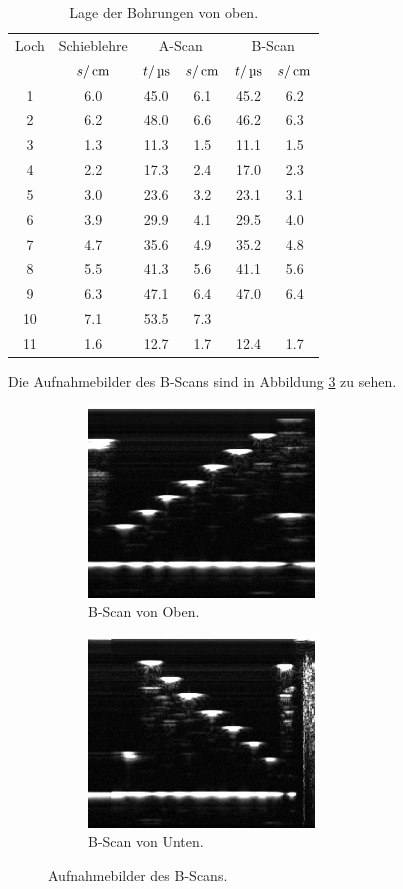 \begin{table}[H]
  \centering
  \begin{tabular}{cc|cc|cc}
    \toprule
    \multicolumn{1}{c}{Loch}& \multicolumn{1}{c|}{Schieblehre} & \multicolumn{2}{c|}{A-Scan}
    & \multicolumn{2}{c}{B-Scan} \\
    & $s/\,\si{\centi\meter}$ & $t/\,\si{\micro\second}$ & $s/\,\si{\centi\meter}$ & $t/\,\si{\micro\second}$ & $s/\,\si{\centi\meter}$ \\
    \midrule
     1  &   6.0 &  45.0 & 6.1 & 45.2 & 6.2 \\
     2  &   6.2 &  48.0 & 6.6 & 46.2 & 6.3 \\
     3  &   1.3 &  11.3 & 1.5 & 11.1 & 1.5 \\
     4  &   2.2 &  17.3 & 2.4 & 17.0 & 2.3 \\
     5  &   3.0 &  23.6 & 3.2 & 23.1 & 3.1 \\
     6  &   3.9 &  29.9 & 4.1 & 29.5 & 4.0 \\
     7  &   4.7 &  35.6 & 4.9 & 35.2 & 4.8 \\
     8  &   5.5 &  41.3 & 5.6 & 41.1 & 5.6 \\
     9  &   6.3 &  47.1 & 6.4 & 47.0 & 6.4 \\
    10  &   7.1 &  53.5 & 7.3 & \hrulefill & \hrulefill \\
    11  &   1.6 &  12.7 & 1.7 & 12.4 & 1.7 \\
    \bottomrule
  \end{tabular}
  \caption{Lage der Bohrungen von oben.}
  \label{tab:unten}
\end{table}
Die Aufnahmebilder des B-Scans sind in Abbildung \ref{fig:bscan} zu sehen.
\begin{figure}[H]
  \centering
  \begin{subfigure}{0.4\textwidth}
    \includegraphics[width=6cm]{bilder/B-ScanUnten.jpg}
    \caption{B-Scan von Oben.}
    \label{sub:oben}
  \end{subfigure}
  \begin{subfigure}{0.4\textwidth}
  \includegraphics[width=6cm]{bilder/B-ScanOben.jpg}
  \caption{B-Scan von Unten.}
  \label{sub:unten}
\end{subfigure}
\caption{Aufnahmebilder des B-Scans.}
\label{fig:bscan}
\end{figure}

